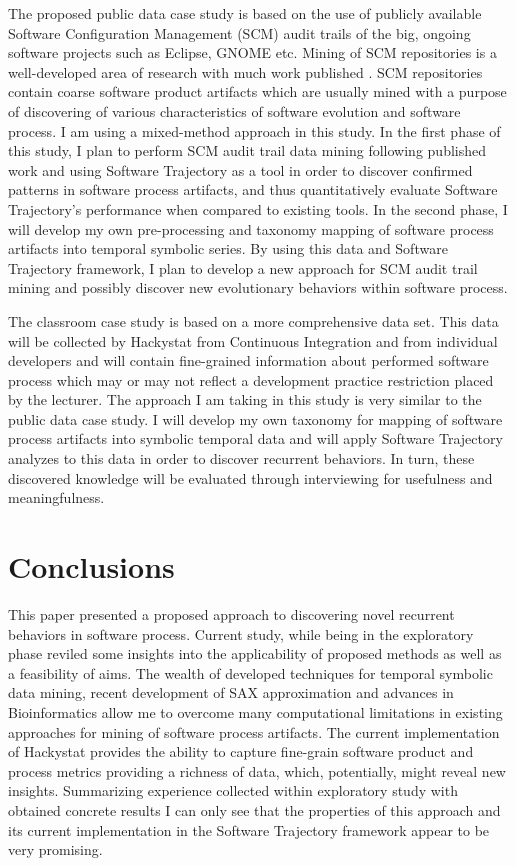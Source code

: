 \documentclass{sig-alternate}
\begin{document}
The proposed public data case study is based on the use of publicly available Software Configuration Management (SCM) audit trails of the big, ongoing software projects such as Eclipse, GNOME etc. Mining of SCM repositories is a well-developed area of research with much work published \cite{citeulike:5043676}. SCM repositories contain coarse software product artifacts which are usually mined with a purpose of discovering of various characteristics of software evolution and software process. I am using a mixed-method approach in this study. In the first phase of this study, I plan to perform SCM audit trail data mining following published work and using Software Trajectory as a tool in order to discover confirmed patterns in software process artifacts, and thus quantitatively evaluate Software Trajectory's performance when compared to existing tools. In the second phase, I will develop my own pre-processing and taxonomy mapping of software process artifacts into temporal symbolic series. By using this data and Software Trajectory framework, I plan to develop a new approach for SCM audit trail mining and possibly discover new evolutionary behaviors within software process. 

The classroom case study is based on a more comprehensive data set. This data will be collected by Hackystat from Continuous Integration and from individual developers and will contain fine-grained information about performed software process which may or may not reflect a development practice restriction placed by the lecturer. The approach I am taking in this study is very similar to the public data case study. I will develop my own taxonomy for mapping of software process artifacts into symbolic temporal data and will apply Software Trajectory analyzes to this data in order to discover recurrent behaviors. In turn, these discovered knowledge will be evaluated through interviewing for usefulness and meaningfulness. 

\section{Conclusions}
This paper presented a proposed approach to discovering novel recurrent behaviors in software process. Current study, while being in the exploratory phase reviled some insights into the applicability of proposed methods as well as a feasibility of aims. The wealth of developed techniques for temporal symbolic data mining, recent development of SAX approximation and advances in Bioinformatics allow me to overcome many computational limitations in existing approaches for mining of software process artifacts. The current implementation of Hackystat provides the ability to capture fine-grain software product and process metrics providing a richness of data, which, potentially, might reveal new insights. Summarizing experience collected within exploratory study with obtained concrete results I can only see that the properties of this approach and its current implementation in the Software Trajectory framework appear to be very promising. 
\end{document}
